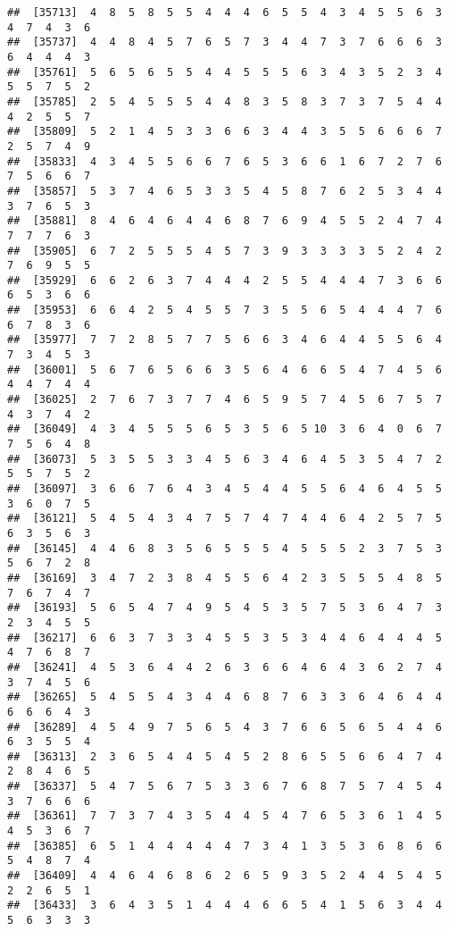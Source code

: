 \documentclass[
]{book}
\begin{document}
\begin{verbatim}
##  [35713]  4  8  5  8  5  5  4  4  4  6  5  5  4  3  4  5  5  6  3  4  7  4  3  6
##  [35737]  4  4  8  4  5  7  6  5  7  3  4  4  7  3  7  6  6  6  3  6  4  4  4  3
##  [35761]  5  6  5  6  5  5  4  4  5  5  5  6  3  4  3  5  2  3  4  5  5  7  5  2
##  [35785]  2  5  4  5  5  5  4  4  8  3  5  8  3  7  3  7  5  4  4  4  2  5  5  7
##  [35809]  5  2  1  4  5  3  3  6  6  3  4  4  3  5  5  6  6  6  7  2  5  7  4  9
##  [35833]  4  3  4  5  5  6  6  7  6  5  3  6  6  1  6  7  2  7  6  7  5  6  6  7
##  [35857]  5  3  7  4  6  5  3  3  5  4  5  8  7  6  2  5  3  4  4  3  7  6  5  3
##  [35881]  8  4  6  4  6  4  4  6  8  7  6  9  4  5  5  2  4  7  4  7  7  7  6  3
##  [35905]  6  7  2  5  5  5  4  5  7  3  9  3  3  3  3  5  2  4  2  7  6  9  5  5
##  [35929]  6  6  2  6  3  7  4  4  4  2  5  5  4  4  4  7  3  6  6  6  5  3  6  6
##  [35953]  6  6  4  2  5  4  5  5  7  3  5  5  6  5  4  4  4  7  6  6  7  8  3  6
##  [35977]  7  7  2  8  5  7  7  5  6  6  3  4  6  4  4  5  5  6  4  7  3  4  5  3
##  [36001]  5  6  7  6  5  6  6  3  5  6  4  6  6  5  4  7  4  5  6  4  4  7  4  4
##  [36025]  2  7  6  7  3  7  7  4  6  5  9  5  7  4  5  6  7  5  7  4  3  7  4  2
##  [36049]  4  3  4  5  5  5  6  5  3  5  6  5 10  3  6  4  0  6  7  7  5  6  4  8
##  [36073]  5  3  5  5  3  3  4  5  6  3  4  6  4  5  3  5  4  7  2  5  5  7  5  2
##  [36097]  3  6  6  7  6  4  3  4  5  4  4  5  5  6  4  6  4  5  5  3  6  0  7  5
##  [36121]  5  4  5  4  3  4  7  5  7  4  7  4  4  6  4  2  5  7  5  6  3  5  6  3
##  [36145]  4  4  6  8  3  5  6  5  5  5  4  5  5  5  2  3  7  5  3  5  6  7  2  8
##  [36169]  3  4  7  2  3  8  4  5  5  6  4  2  3  5  5  5  4  8  5  7  6  7  4  7
##  [36193]  5  6  5  4  7  4  9  5  4  5  3  5  7  5  3  6  4  7  3  2  3  4  5  5
##  [36217]  6  6  3  7  3  3  4  5  5  3  5  3  4  4  6  4  4  4  5  4  7  6  8  7
##  [36241]  4  5  3  6  4  4  2  6  3  6  6  4  6  4  3  6  2  7  4  3  7  4  5  6
##  [36265]  5  4  5  5  4  3  4  4  6  8  7  6  3  3  6  4  6  4  4  6  6  6  4  3
##  [36289]  4  5  4  9  7  5  6  5  4  3  7  6  6  5  6  5  4  4  6  6  3  5  5  4
##  [36313]  2  3  6  5  4  4  5  4  5  2  8  6  5  5  6  6  4  7  4  2  8  4  6  5
##  [36337]  5  4  7  5  6  7  5  3  3  6  7  6  8  7  5  7  4  5  4  3  7  6  6  6
##  [36361]  7  7  3  7  4  3  5  4  4  5  4  7  6  5  3  6  1  4  5  4  5  3  6  7
##  [36385]  6  5  1  4  4  4  4  4  7  3  4  1  3  5  3  6  8  6  6  5  4  8  7  4
##  [36409]  4  4  6  4  6  8  6  2  6  5  9  3  5  2  4  4  5  4  5  2  2  6  5  1
##  [36433]  3  6  4  3  5  1  4  4  4  6  6  5  4  1  5  6  3  4  4  5  6  3  3  3

\end{verbatim}
\end{document}
